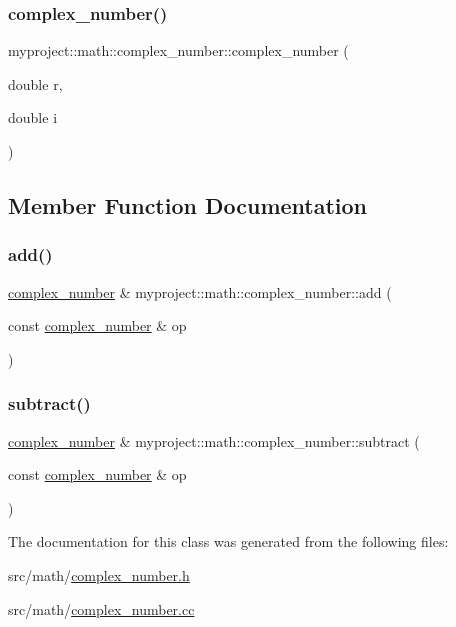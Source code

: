 \subsubsection{\texorpdfstring{complex\+\_\+number()}{complex\_number()}}
{\footnotesize\ttfamily myproject\+::math\+::complex\+\_\+number\+::complex\+\_\+number (\begin{DoxyParamCaption}\item[{double}]{r,  }\item[{double}]{i }\end{DoxyParamCaption})}



\subsection{Member Function Documentation}
\mbox{\label{classmyproject_1_1math_1_1complex__number_a395975e58795371affef1d04312f6783}} 
\subsubsection{\texorpdfstring{add()}{add()}}
{\footnotesize\ttfamily \hyperlink{classmyproject_1_1math_1_1complex__number}{complex\+\_\+number} \& myproject\+::math\+::complex\+\_\+number\+::add (\begin{DoxyParamCaption}\item[{const \hyperlink{classmyproject_1_1math_1_1complex__number}{complex\+\_\+number} \&}]{op }\end{DoxyParamCaption})}

\mbox{\label{classmyproject_1_1math_1_1complex__number_ad1b60335bc0b65ec6618306ee6a1bd64}} 
\subsubsection{\texorpdfstring{subtract()}{subtract()}}
{\footnotesize\ttfamily \hyperlink{classmyproject_1_1math_1_1complex__number}{complex\+\_\+number} \& myproject\+::math\+::complex\+\_\+number\+::subtract (\begin{DoxyParamCaption}\item[{const \hyperlink{classmyproject_1_1math_1_1complex__number}{complex\+\_\+number} \&}]{op }\end{DoxyParamCaption})}



The documentation for this class was generated from the following files\+:\begin{DoxyCompactItemize}
\item 
src/math/\hyperlink{complex__number_8h}{complex\+\_\+number.\+h}\item 
src/math/\hyperlink{complex__number_8cc}{complex\+\_\+number.\+cc}\end{DoxyCompactItemize}

